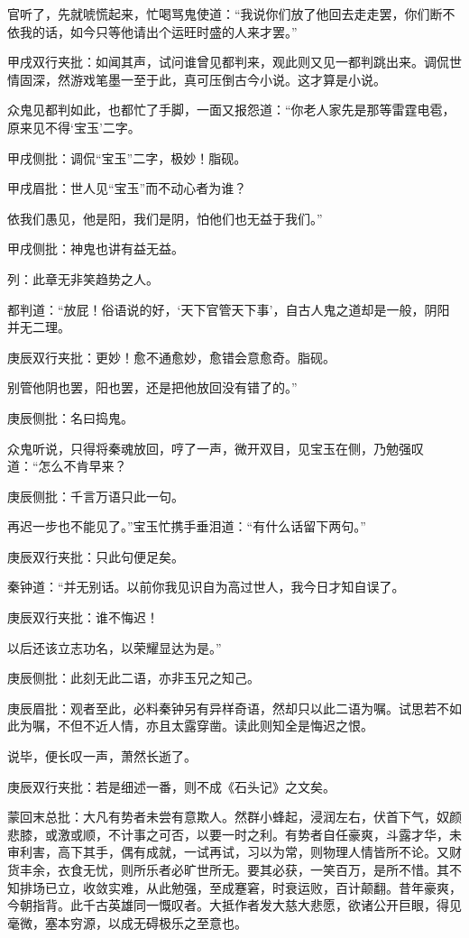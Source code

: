 \begin{parag}
官听了，先就唬慌起来，忙喝骂鬼使道：“我说你们放了他回去走走罢，你们断不依我的话，如今只等他请出个运旺时盛的人来才罢。”\begin{note}甲戌双行夹批：如闻其声，试问谁曾见都判来，观此则又见一都判跳出来。调侃世情固深，然游戏笔墨一至于此，真可压倒古今小说。这才算是小说。\end{note}众鬼见都判如此，也都忙了手脚，一面又报怨道：“你老人家先是那等雷霆电雹，原来见不得‘宝玉’二字。\begin{note}甲戌侧批：调侃“宝玉”二字，极妙！脂砚。\end{note}\begin{note}甲戌眉批：世人见“宝玉”而不动心者为谁？\end{note}依我们愚见，他是阳，我们是阴，怕他们也无益于我们。”\begin{note}甲戌侧批：神鬼也讲有益无益。\end{note}\begin{note}列：此章无非笑趋势之人。\end{note}都判道：“放屁！俗语说的好，‘天下官管天下事’，自古人鬼之道却是一般，阴阳并无二理。\begin{note}庚辰双行夹批：更妙！愈不通愈妙，愈错会意愈奇。脂砚。\end{note}别管他阴也罢，阳也罢，还是把他放回没有错了的。”\begin{note}庚辰侧批：名曰捣鬼。\end{note}众鬼听说，只得将秦魂放回，哼了一声，微开双目，见宝玉在侧，乃勉强叹道：“怎么不肯早来？\begin{note}庚辰侧批：千言万语只此一句。\end{note}再迟一步也不能见了。”宝玉忙携手垂泪道：“有什么话留下两句。”\begin{note}庚辰双行夹批：只此句便足矣。\end{note}秦钟道：“并无别话。以前你我见识自为高过世人，我今日才知自误了。\begin{note}庚辰双行夹批：谁不悔迟！\end{note}以后还该立志功名，以荣耀显达为是。”\begin{note}庚辰侧批：此刻无此二语，亦非玉兄之知己。\end{note}\begin{note}庚辰眉批：观者至此，必料秦钟另有异样奇语，然却只以此二语为嘱。试思若不如此为嘱，不但不近人情，亦且太露穿凿。读此则知全是悔迟之恨。\end{note}说毕，便长叹一声，萧然长逝了。\begin{note}庚辰双行夹批：若是细述一番，则不成《石头记》之文矣。\end{note}
\end{parag}


\begin{parag}


    \begin{note}蒙回末总批：大凡有势者未尝有意欺人。然群小蜂起，浸润左右，伏首下气，奴颜悲膝，或激或顺，不计事之可否，以要一时之利。有势者自任豪爽，斗露才华，未审利害，高下其手，偶有成就，一试再试，习以为常，则物理人情皆所不论。又财货丰余，衣食无忧，则所乐者必旷世所无。要其必获，一笑百万，是所不惜。其不知排场已立，收敛实难，从此勉强，至成蹇窘，时衰运败，百计颠翻。昔年豪爽，今朝指背。此千古英雄同一慨叹者。大抵作者发大慈大悲愿，欲诸公开巨眼，得见毫微，塞本穷源，以成无碍极乐之至意也。\end{note}
\end{parag}

